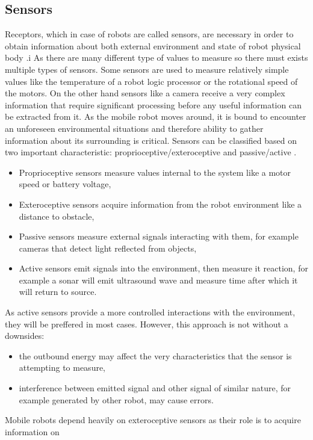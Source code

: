 \subsection{Sensors}
Receptors, which in case of robots are called sensors, are necessary in order to obtain information
about both external environment and state of robot physical body \cite{Siegwart2011}.i
As there are many different  type of values to measure so there must exists multiple types of
sensors. 
Some sensors are used to measure relatively simple values like the temperature of a robot 
logic processor or the rotational speed of the motors.
On the other hand sensors like a camera receive a very complex information that require
significant processing before any useful information can be extracted from it.
As the mobile robot moves around, it is bound to encounter an unforeseen environmental
situations and therefore ability to gather information about its surrounding is critical.
Sensors can be classified based on two important characteristic: proprioceptive/exteroceptive and
passive/active \cite{Borenstein1997}.
\begin{itemize}
	\item Proprioceptive sensors measure values internal to the system like a motor speed or
		battery voltage,
	\item Exteroceptive sensors acquire information from the robot environment like a distance
		to obstacle, 
	\item Passive sensors measure external signals interacting with them, for example cameras
		that detect light reflected from objects,
	\item Active sensors emit signals into the environment, then measure it reaction, for example
		a sonar will emit ultrasound wave and measure time after which it will return to source. 
\end{itemize}
As active sensors provide a  more controlled interactions with the environment, they  will be
preffered in most cases. However, this approach is not without a downsides:
\begin{itemize}
	\item the outbound energy may affect the very characteristics that the sensor is attempting
		to measure, 
	\item interference between emitted signal and other signal of similar nature, for 
		example generated by other robot, may cause errors.
\end{itemize}
Mobile robots depend heavily on exteroceptive sensors as their role is to acquire information on
